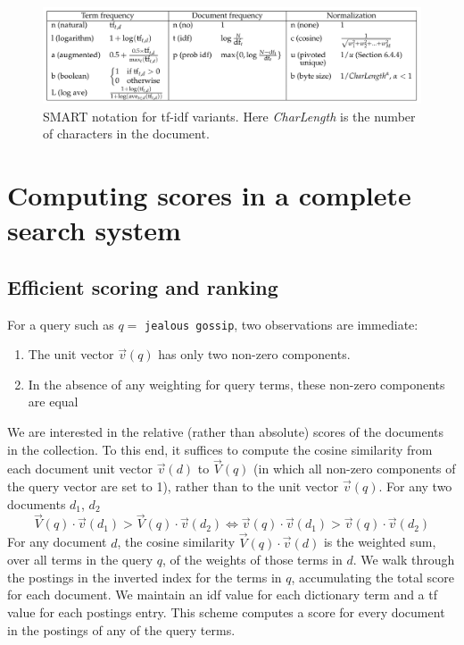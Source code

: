 \documentclass[letterpaper,11pt]{article}
\newcommand{\code}[1]{\texttt{#1}}
\begin{document}
\begin{figure}[H]
    \centering
    \includegraphics[scale=0.30]{sect6/figure_6_15.png}
    \caption{SMART notation for tf-idf variants. Here \textit{CharLength} is the number of characters in the document.}
\end{figure}

\section{Computing scores in a complete search system}

\subsection{Efficient scoring and ranking}
For a query such as $q =$ \code{jealous gossip}, two observations are immediate:
\begin{enumerate}
    \item The unit vector $\vec{v}(q)$ has only two non-zero components.
    \item In the absence of any weighting for query terms, these non-zero components are equal
\end{enumerate}

We are interested in the relative (rather than absolute) scores of the documents in the collection. To this end, it suffices to compute the cosine similarity from each document unit vector $\vec{v}(d)$ to $\vec{V}(q)$ (in which all non-zero components of the query vector are set to 1), rather than to the unit vector $\vec{v}(q)$. For any two documents $d_1$, $d_2$
\[
\vec{V}(q) \cdot \vec{v}(d_1) > \vec{V}(q) \cdot \vec{v}(d_2) \iff \vec{v}(q) \cdot \vec{v}(d_1) > \vec{v}(q) \cdot \vec{v}(d_2)
\]
For any document $d$, the cosine similarity $\vec{V}(q) \cdot \vec{v}(d)$ is the weighted sum, over all terms in the query $q$, of the weights of those terms in $d$. We walk through the postings in the inverted index for the terms in $q$, accumulating the total score for each document. We maintain an idf value for each dictionary term and a tf value for each postings entry. This scheme computes a score for every document in the postings of any of the query terms.
\end{document}
